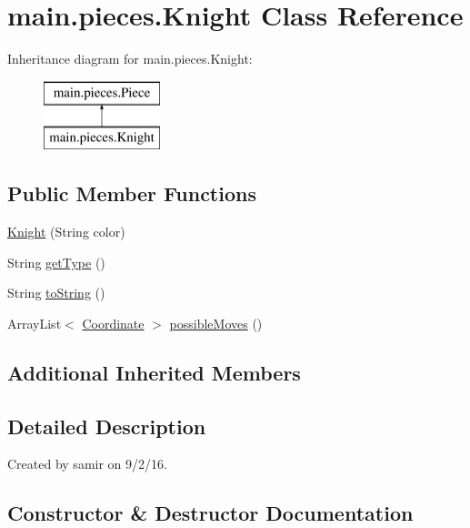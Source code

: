 \hypertarget{classmain_1_1pieces_1_1_knight}{}\section{main.\+pieces.\+Knight Class Reference}
\label{classmain_1_1pieces_1_1_knight}
Inheritance diagram for main.\+pieces.\+Knight\+:\begin{figure}[H]
\begin{center}
\leavevmode
\includegraphics[height=2.000000cm]{classmain_1_1pieces_1_1_knight}
\end{center}
\end{figure}
\subsection*{Public Member Functions}
\begin{DoxyCompactItemize}
\item 
\hyperlink{classmain_1_1pieces_1_1_knight_a0db1e21cc4f2fa35655c2ee4ae00c9d5}{Knight} (String color)
\item 
String \hyperlink{classmain_1_1pieces_1_1_knight_a6c453a86bbecb2936ea4c7c472ebf360}{get\+Type} ()
\item 
String \hyperlink{classmain_1_1pieces_1_1_knight_aaf2e8a203e5875f9429eb528616adc53}{to\+String} ()
\item 
Array\+List$<$ \hyperlink{classmain_1_1model_1_1_coordinate}{Coordinate} $>$ \hyperlink{classmain_1_1pieces_1_1_knight_a9aa67ae101fd96efce020323b45511a7}{possible\+Moves} ()
\end{DoxyCompactItemize}
\subsection*{Additional Inherited Members}


\subsection{Detailed Description}
Created by samir on 9/2/16. 

\subsection{Constructor \& Destructor Documentation}
\hypertarget{classmain_1_1pieces_1_1_knight_a0db1e21cc4f2fa35655c2ee4ae00c9d5}{}\label{classmain_1_1pieces_1_1_knight_a0db1e21cc4f2fa35655c2ee4ae00c9d5} 
